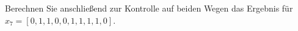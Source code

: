 Berechnen Sie anschließend zur Kontrolle auf beiden Wegen das Ergebnis für $x_7=[0,1,1,0,0,1,1,1,1,0]$.


